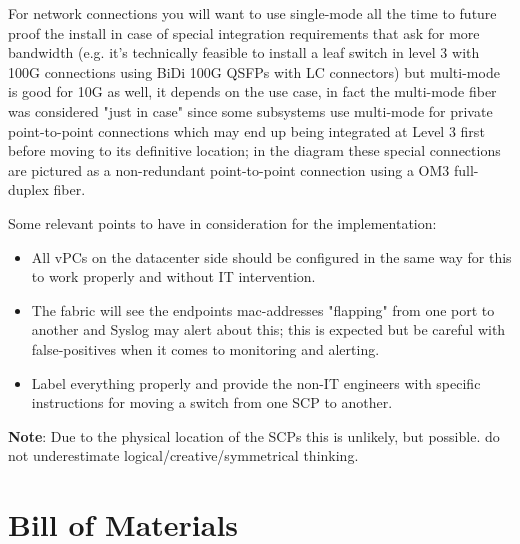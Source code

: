     For network connections you will want to use single-mode all the time to future proof the install in case of special integration requirements that ask for more bandwidth (e.g. it's technically feasible to install a leaf switch in level 3 with 100G connections using BiDi 100G QSFPs with LC connectors) but multi-mode is good for 10G as well, it depends on the use case, in fact the multi-mode fiber was considered "just in case" since some subsystems use multi-mode for private point-to-point connections which may end up being integrated at Level 3 first before moving to its definitive location; in the diagram these special connections are pictured as a non-redundant point-to-point connection using a OM3 full-duplex fiber.

    Some relevant points to have in consideration for the implementation:
    \begin{itemize}
      \item All vPCs on the datacenter side should be configured in the same way for this to work properly and without IT intervention.
      \item The fabric will see the endpoints mac-addresses "flapping" from one port to another and Syslog may alert about this; this is expected but be careful with false-positives when it comes to monitoring and alerting.
      \item Label everything properly and provide the non-IT engineers with specific instructions for moving a switch from one SCP to another.
    \end{itemize}

    \textbf{Note}: Due to the physical location of the SCPs this is unlikely, but possible. do not underestimate logical/creative/symmetrical thinking.
 \newpage
\section{Bill of Materials}


